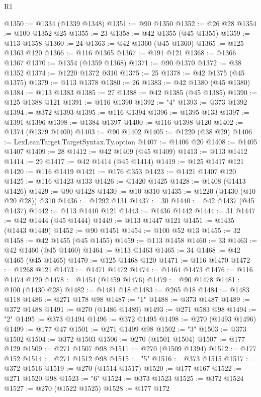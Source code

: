 \begin{lexlean}{R1}
\begin{coremodule}
@1350 := @1334 (@1339 @1348)
@1351 := @90 @1350
@1352 := @26 @28
@1354 := @100 @1352 @25
@1355 := 23
@1358 := @42 @1355 (@45 @1355)
@1359 := @113 @1358
@1360 := 24
@1363 := @42 @1360 (@45 @1360)
@1365 := @125 @1363 @120
@1366 := @116 @1365
@1367 := @191 @121
@1368 := @1366 @1367
@1370 := @1354 (@1359 @1368)
@1371 := @90 @1370
@1372 := @38 @1352
@1374 := @1220 @1372 @310
@1375 := 25
@1378 := @42 @1375 (@45 @1375)
@1379 := @113 @1378
@1380 := 26
@1383 := @42 @1380 (@45 @1380)
@1384 := @113 @1383
@1385 := 27
@1388 := @42 @1385 (@45 @1385)
@1390 := @125 @1388 @121
@1391 := @116 @1390
@1392 := "4"
@1393 := @373 @1392
@1394 := @372 @1393
@1395 := @116 @1394
@1396 := @1395 @133
@1397 := @1391 @1396
@1398 := @1384 @1397
@1400 := @116 @1398 @120
@1402 := @1374 (@1379 @1400)
@1403 := @90 @1402
@1405 := @1220 (@38 @29)
@1406 := LexLeanTarget.TargetSyntax.Ty.option
@1407 := @1406 @20
@1408 := @1405 @1407
@1409 := 28
@1412 := @42 @1409 (@45 @1409)
@1413 := @113 @1412
@1414 := 29
@1417 := @42 @1414 (@45 @1414)
@1419 := @125 @1417 @121
@1420 := @116 @1419
@1421 := @176 @353
@1423 := @1421 @1407 @120
@1425 := @116 @1423 @133
@1426 := @1420 @1425
@1428 := @1408 (@1413 @1426)
@1429 := @90 @1428
@1430 := @10 @310
@1435 := @1220 (@1430 (@10 @20 @28)) @310
@1436 := @1292 @131
@1437 := 30
@1440 := @42 @1437 (@45 @1437)
@1442 := @113 @1440 @121
@1443 := @1436 @1442
@1444 := 31
@1447 := @42 @1444 (@45 @1444)
@1449 := @113 @1447 @121
@1451 := @1435 (@1443 @1449)
@1452 := @90 @1451
@1454 := @100 @52 @13
@1455 := 32
@1458 := @42 @1455 (@45 @1455)
@1459 := @113 @1458
@1460 := 33
@1463 := @42 @1460 (@45 @1460)
@1464 := @113 @1463
@1465 := 34
@1468 := @42 @1465 (@45 @1465)
@1470 := @125 @1468 @120
@1471 := @116 @1470
@1472 := @1268 @121
@1473 := @1471 @1472
@1474 := @1464 @1473
@1476 := @116 @1474 @120
@1478 := @1454 (@1459 @1476)
@1479 := @90 @1478
@1481 := @100 (@1430 @28)
@1482 := @1481 @18
@1483 := @265 @18
@1484 := @1483 @118
@1486 := @271 @178 @98
@1487 := "1"
@1488 := @373 @1487
@1489 := @372 @1488
@1491 := @270 (@1486 @1489)
@1493 := @271 @583 @98
@1494 := "2"
@1495 := @373 @1494
@1496 := @372 @1495
@1498 := @270 (@1493 @1496)
@1499 := @177 @47
@1501 := @271 @1499 @98
@1502 := "3"
@1503 := @373 @1502
@1504 := @372 @1503
@1506 := @270 (@1501 @1504)
@1507 := @177 @129
@1509 := @271 @1507 @98
@1511 := @270 (@1509 @1394)
@1512 := @177 @152
@1514 := @271 @1512 @98
@1515 := "5"
@1516 := @373 @1515
@1517 := @372 @1516
@1519 := @270 (@1514 @1517)
@1520 := @177 @167
@1522 := @271 @1520 @98
@1523 := "6"
@1524 := @373 @1523
@1525 := @372 @1524
@1527 := @270 (@1522 @1525)
@1528 := @177 @172

\end{coremodule}
\end{lexlean}

